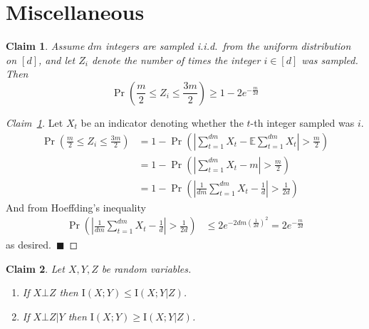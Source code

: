 \documentclass[final,12pt]{colt2018}
\newcommand{\E}{\mathbb{E}}
\newcommand{\II}[1]{\mathrm{I}\left(#1\right)}
\newtheorem{claim}{Claim}[section]
\begin{document}
\section{Miscellaneous}

\begin{claim}\label{claim-chernoff}
Assume $dm$ integers are sampled i.i.d.\ from the uniform distribution on $[d]$, and let $Z_i$ denote the number of times the integer $i\in[d]$ was sampled. Then 
\[
\Pr\left(\frac{m}{2}\leq Z_i \leq \frac{3m}{2}\right) \geq 1-2e^{-\frac{m}{2d}}
\]
\end{claim}

\begin{proof}[Claim~\ref{claim-chernoff}]
	Let $X_t$ be an indicator denoting whether the $t$-th integer sampled was $i$.
	\begin{align*}
	\Pr\left(\frac{m}{2}\leq Z_i \leq \frac{3m}{2}\right) & = 1-\Pr\left(\left| \sum_{t=1}^{dm} X_t - \E \sum_{t=1}^{dm} X_t \right|> \frac{m}{2}\right) \\
	& = 1-\Pr\left(\left| \sum_{t=1}^{dm} X_t - m \right|> \frac{m}{2}\right) \\
	& = 1-\Pr\left(\left| \frac{1}{dm}\sum_{t=1}^{dm} X_t - \frac{1}{d} \right|> \frac{1}{2d}\right)
	\end{align*}
	And from Hoeffding's inequality \citep[lemma B.6 in][]{shalev2014understanding}
	\begin{align*}
		\Pr\left(\left| \frac{1}{dm}\sum_{t=1}^{dm} X_t - \frac{1}{d} \right|> \frac{1}{2d}\right) & \leq 2e^{-2dm\left(\frac{1}{2d}\right)^2} = 2e^{-\frac{m}{2d}}
	\end{align*}
	as desired.~$\blacksquare$
\end{proof}
 
\begin{claim}\label{conditional-information-inequality}
 	Let $X,Y,Z$ be random variables. 
 	\begin{enumerate}
 		\item{\label{cii-independence} If $X\bot Z$ then $\II{X;Y} \leq \II{X;Y|Z}$.}
 		\item{\label{cii-conditional-independence} If $X\bot Z | Y$ then $\II{X;Y} \geq \II{X;Y|Z}$.}
 	\end{enumerate}
\end{claim}
 
\end{document}
